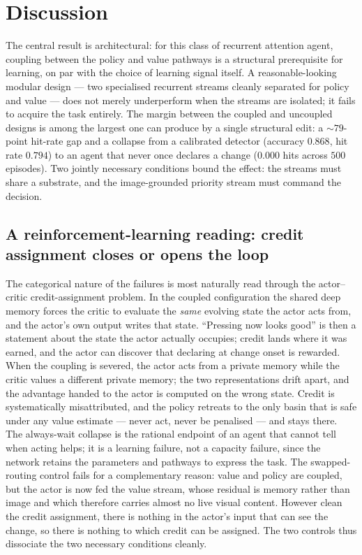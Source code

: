 \section{Discussion}
\label{sec:discussion}

The central result is architectural: for this class of recurrent attention agent, coupling between the policy and value pathways is a structural prerequisite for learning, on par with the choice of learning signal itself. A reasonable-looking modular design --- two specialised recurrent streams cleanly separated for policy and value --- does not merely underperform when the streams are isolated; it fails to acquire the task entirely. The margin between the coupled and uncoupled designs is among the largest one can produce by a single structural edit: a $\sim$$79$-point hit-rate gap and a collapse from a calibrated detector (accuracy $0.868$, hit rate $0.794$) to an agent that never once declares a change ($0.000$ hits across $500$ episodes). Two jointly necessary conditions bound the effect: the streams must share a substrate, and the image-grounded priority stream must command the decision.

\subsection{A reinforcement-learning reading: credit assignment closes or opens the loop}
The categorical nature of the failures is most naturally read through the actor--critic credit-assignment problem. In the coupled configuration the shared deep memory forces the critic to evaluate the \emph{same} evolving state the actor acts from, and the actor's own output writes that state. ``Pressing now looks good'' is then a statement about the state the actor actually occupies; credit lands where it was earned, and the actor can discover that declaring at change onset is rewarded. When the coupling is severed, the actor acts from a private memory while the critic values a different private memory; the two representations drift apart, and the advantage handed to the actor is computed on the wrong state. Credit is systematically misattributed, and the policy retreats to the only basin that is safe under any value estimate --- never act, never be penalised --- and stays there. The always-wait collapse is the rational endpoint of an agent that cannot tell when acting helps; it is a learning failure, not a capacity failure, since the network retains the parameters and pathways to express the task. The swapped-routing control fails for a complementary reason: value and policy are coupled, but the actor is now fed the value stream, whose residual is memory rather than image and which therefore carries almost no live visual content. However clean the credit assignment, there is nothing in the actor's input that can see the change, so there is nothing to which credit can be assigned. The two controls thus dissociate the two necessary conditions cleanly.

